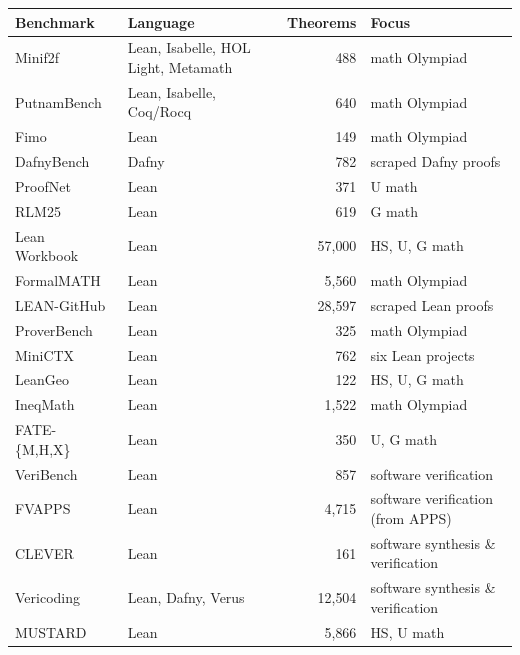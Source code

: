 \begin{table}[h]
\centering
\small
\setlength{\tabcolsep}{4pt}
\renewcommand{\arraystretch}{1.05}
\begin{tabularx}{\textwidth}{@{}
    >{\raggedright\arraybackslash}p{3.3cm}
    l
    r
    >{\raggedright\arraybackslash}X@{}}
\textbf{Benchmark} & \textbf{Language} & \textbf{Theorems} & \textbf{Focus} \\
\midrule
Minif2f~\cite{zheng2021minif2f}
  & Lean, Isabelle, HOL Light, Metamath & 488 & math Olympiad \\
PutnamBench~\cite{tsoukalas2024putnambench}
  & Lean, Isabelle, Coq/Rocq & 640 & math Olympiad \\
Fimo~\cite{liu2023fimo}
  & Lean & 149 & math Olympiad \\
DafnyBench~\cite{loughridge2024dafnybench}
  & Dafny & 782 & scraped Dafny proofs \\
ProofNet~\cite{azerbayev2023proofnet}
  & Lean & 371 & U math \\
RLM25~\cite{poiroux2025reliable}
  & Lean & 619 & G math \\
Lean Workbook~\cite{ying2024lean}
  & Lean & 57{,}000 & HS, U, G math \\
FormalMATH~\cite{yu2025formalmath}
  & Lean & 5{,}560 & math Olympiad \\
LEAN-GitHub~\cite{wu2024lean}
  & Lean & 28{,}597 & scraped Lean proofs \\
ProverBench~\cite{ren2025deepseek}
  & Lean & 325 & math Olympiad \\
MiniCTX~\cite{hu2024minictx}
  & Lean & 762 & six Lean projects \\
LeanGeo~\cite{leangeo}
  & Lean & 122 & HS, U, G math \\
IneqMath~\cite{lu2025solving}
  & Lean & 1{,}522 & math Olympiad \\
FATE-\{M,H,X\}~\cite{jiang2025fate}
  & Lean & 350 & U, G math \\
VeriBench~\cite{barkallah2025veribench}
  & Lean & 857 & software verification \\
FVAPPS~\cite{dougherty2025proving}
  & Lean & 4{,}715 & software verification (from APPS) \\
CLEVER~\cite{thakur2025clever}
  & Lean & 161 & software synthesis \& verification \\
Vericoding~\cite{bursuc2025benchmark}
  & Lean, Dafny, Verus & 12{,}504 & software synthesis \& verification \\
MUSTARD~\cite{huang2024mustard}
  & Lean & 5{,}866 & HS, U math \\

\end{tabularx}
\end{table}
